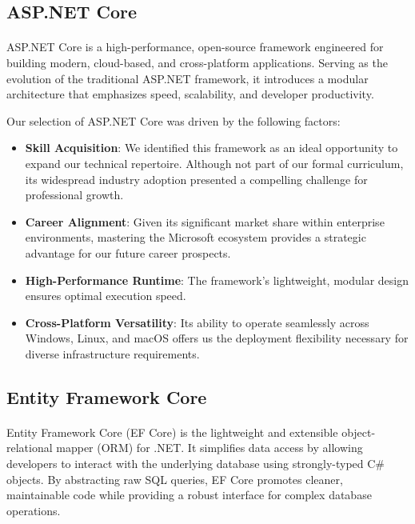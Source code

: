 
\subsection{ASP.NET Core}
\paragraph{}ASP.NET Core \cite{aspnetcore} is a high-performance, open-source framework engineered for building modern, cloud-based, and cross-platform applications. Serving as the evolution of the traditional ASP.NET framework, it introduces a modular architecture that emphasizes speed, scalability, and developer productivity.

Our selection of ASP.NET Core was driven by the following factors:
\begin{itemize}
\item \textbf{Skill Acquisition}: We identified this framework as an ideal opportunity to expand our technical repertoire. Although not part of our formal curriculum, its widespread industry adoption presented a compelling challenge for professional growth.
\item \textbf{Career Alignment}: Given its significant market share within enterprise environments, mastering the Microsoft ecosystem provides a strategic advantage for our future career prospects.
\item \textbf{High-Performance Runtime}: The framework's lightweight, modular design ensures optimal execution speed.
\item \textbf{Cross-Platform Versatility}: Its ability to operate seamlessly across Windows, Linux, and macOS offers us the deployment flexibility necessary for diverse infrastructure requirements.
\end{itemize}

\subsection{Entity Framework Core}
\paragraph{}Entity Framework Core (EF Core) \cite{entityframeworkcore} is the lightweight and extensible object-relational mapper (ORM) for .NET. It simplifies data access by allowing developers to interact with the underlying database using strongly-typed C\# objects. By abstracting raw SQL queries, EF Core promotes cleaner, maintainable code while providing a robust interface for complex database operations.


